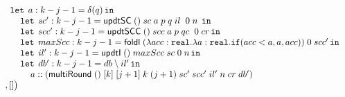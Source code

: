 \begin{figure}
\[\begin{array}{l}
 \hspace{0.4cm} \mathop{\mathtt{let}} \; a: k - j - 1 = \delta (q)  \mathop{ \mathtt{in}} \\
 \hspace{0.8cm} \mathop{\mathtt{let}} \; sc': k - j - 1 =  \mathsf{updtSC} \; () \; sc  \; a \; p
                \; q \; il \;  \; 0 \;  n \;  \mathop{ \mathtt{in}} \\
 \hspace{0.8cm} \mathop{\mathtt{let}} \; scc': k - j - 1 =  \mathsf{updtSCC} \; () \; scc \; a \; p
                \; qc \;  \; 0 \;  cr \mathop{ \mathtt{in}} \\
 \hspace{0.8cm} \mathop{\mathtt{let}} \; maxScc: k - j - 1 =  \mathsf{foldl} \; 
                (\lambda acc : \mathtt{real}. \lambda a: \mathtt{real}. 
                \mathtt{if} ( acc < a, a, acc)) \; 0 \; scc' \mathop{ \mathtt{in}} \\
 \hspace{0.8cm} \mathop{\mathtt{let}} \; il': k - j - 1 =  \mathsf{updtI}  \; () \; maxScc \; sc
                \; 0 \; n  \mathop{ \mathtt{in}} \\
 \hspace{0.8cm} \mathop{\mathtt{let}} \; db': k - j - 1 =  db \setminus il' \mathop{ \mathtt{in}} \\
 \hspace{1.2cm} a :: (\mathsf{multiRound} \; () \; [k] \; [j + 1]  
                 \; k \; (j+1) \; sc' \; scc' \; il'
                 \; n \; cr \; db')\\ 
 \hspace{0.2cm} , []  \big)
\end{array}
\]

\end{figure}



